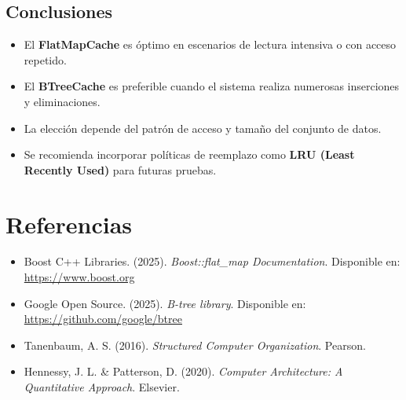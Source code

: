 \documentclass[12pt,a4paper]{article}
\begin{document}
\subsection{Conclusiones}

\begin{itemize}
    \item El \textbf{FlatMapCache} es óptimo en escenarios de lectura intensiva o con acceso repetido.
    \item El \textbf{BTreeCache} es preferible cuando el sistema realiza numerosas inserciones y eliminaciones.
    \item La elección depende del patrón de acceso y tamaño del conjunto de datos.
    \item Se recomienda incorporar políticas de reemplazo como \textbf{LRU (Least Recently Used)} para futuras pruebas.
\end{itemize}

\section{Referencias}

\begin{itemize}
    \item Boost C++ Libraries. (2025). \textit{Boost::flat\_map Documentation}. Disponible en: \url{https://www.boost.org}
    \item Google Open Source. (2025). \textit{B-tree library}. Disponible en: \url{https://github.com/google/btree}
    \item Tanenbaum, A. S. (2016). \textit{Structured Computer Organization}. Pearson.
    \item Hennessy, J. L. \& Patterson, D. (2020). \textit{Computer Architecture: A Quantitative Approach}. Elsevier.
\end{itemize}
\end{document}
